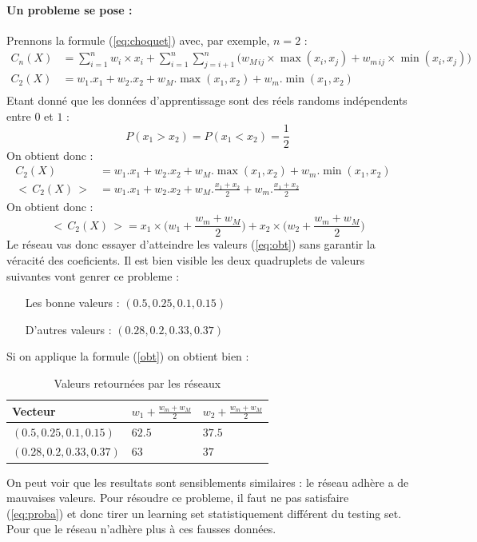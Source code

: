 \paragraph{Un probleme se pose :}
Prennons la formule (\ref{eq:choquet}) avec, par exemple, $n = 2$ :
\begin{align*}
    C_n (X)
    & =
        \sum_{i=1}^{n}
                w_i \times x_i +
            \sum_{i=1}^{n}\sum_{j=i+1}^{n}
            \Big(
                w_{M\,ij} \times \max(x_i,x_j) + w_{m\,ij} \times \min(x_i,x_j)
            \Big)
    &\\
    C_2 (X)
    & =
        w_1.x_1 + w_2.x_2 + w_M.\max(x_1,x_2) + w_m.\min(x_1,x_2)
    &\\
\end{align*}
Etant donné que les données d'apprentissage sont des réels randoms indépendents entre $0$ et $1$ :
\begin{equation}
    \label{eq:proba}
    P(x_1 > x_2) = P(x_1 < x_2) = \frac{1}{2}
\end{equation}
On obtient donc :
\begin{align*}
    C_2 (X)
    & =
        w_1.x_1 + w_2.x_2 + w_M.\max(x_1,x_2) + w_m.\min(x_1,x_2)
    &\\
    <\, C_2 (X) \,>
    & =
        w_1.x_1 + w_2.x_2 + w_M.\frac{x_1 + x_2}{2} + w_m.\frac{x_1 + x_2}{2}
    &
\end{align*}
On obtient donc :
\begin{equation}
    \label{eq:obt}
    <\, C_2 (X) \,> =
        x_1 \times \Big(w_1 + \frac{w_m + w_M}{2}\Big) + x_2 \times \Big(w_2 + \frac{w_m + w_M}{2}\Big)
\end{equation}
Le réseau vas donc essayer d'atteindre les valeurs (\ref{eq:obt}) sans garantir la véracité des coeficients.
Il est bien visible les deux quadruplets de valeurs suivantes vont genrer ce probleme :
\begin{itemize}
    \item[Les bonne valeurs :] $(0.5, 0.25, 0.1, 0.15)$
    \item[D'autres valeurs :] $(0.28, 0.2, 0.33, 0.37)$
\end{itemize}
Si on applique la formule (\ref{obt}) on obtient bien :
\begin{table}[H]
    \centering
    \begin{tabular}{|l|l|l|}
        \hline
        Vecteur & $w_1 + \frac{w_m + w_M}{2}$ & $w_2 + \frac{w_m + w_M}{2}$ \\ \hline \hline
        $(0.5, 0.25, 0.1, 0.15)$  & $62.5$ & $37.5$ \\ \hline
        $(0.28, 0.2, 0.33, 0.37)$ &  $63$  &  $37$  \\ \hline
    \end{tabular}
    \label{tab:pb_tab}
    \caption{Valeurs retournées par les réseaux}
\end{table}
On peut voir que les resultats sont sensiblements similaires : le réseau adhère a de mauvaises valeurs.
Pour résoudre ce probleme, il faut ne pas satisfaire (\ref{eq:proba}) et donc tirer un learning
set statistiquement différent du testing set.
Pour que le réseau n'adhère plus à ces fausses données.\\


